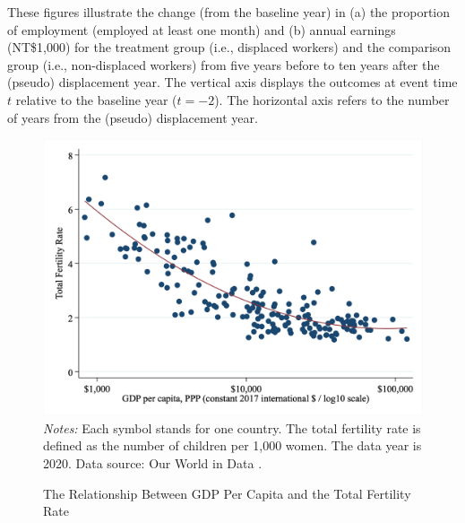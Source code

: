 \begin{singlespace}
        \begin{footnotesize}
        		 These figures illustrate the change (from the baseline year) in (a) the proportion of employment (employed at least one month) and (b) annual earnings (NT\$1,000) for the treatment group (i.e., displaced workers) and the comparison group (i.e., non-displaced workers) from five years before to ten years after the (pseudo) displacement year. The vertical axis displays the outcomes at event time $t$ relative to the baseline year ($t = -2$). The horizontal axis refers to the number of years from the (pseudo) displacement year.
        \end{footnotesize}
\end{singlespace}



\newpage
\begin{figure}[H]
	\centering
	\caption{The Relationship Between GDP Per Capita and the Total Fertility Rate}\label{fig.gdp_fertility}
	\includegraphics[width=0.8\linewidth]{figures/FC1.jpg}\\
	\fontsize{10}{10pt}\selectfont
	\flushleft
	\emph{Notes:} Each symbol stands for one country. The total fertility rate is defined as the number of children per 1,000 women. The data year is 2020. Data source: Our World in Data \citep{owidfertilityrate,owidgdp}.
\end{figure}



